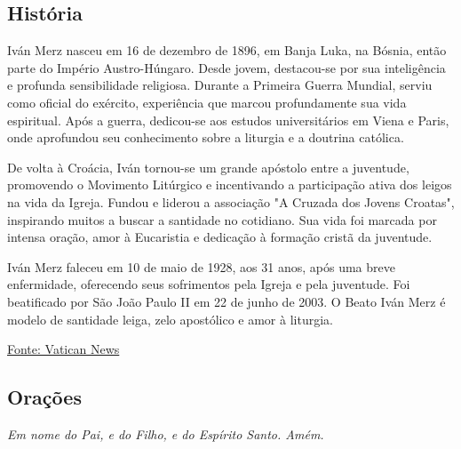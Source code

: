 \documentclass[18pt]{article}
\begin{document}
\begin{justify}
\begin{center}
\section{História}\label{sec:História}
\end{center}

Iván Merz nasceu em 16 de dezembro de 1896, em Banja Luka, na Bósnia, então parte do Império Austro-Húngaro. Desde jovem, destacou-se por sua inteligência e profunda sensibilidade religiosa. Durante a Primeira Guerra Mundial, serviu como oficial do exército, experiência que marcou profundamente sua vida espiritual. Após a guerra, dedicou-se aos estudos universitários em Viena e Paris, onde aprofundou seu conhecimento sobre a liturgia e a doutrina católica.

De volta à Croácia, Iván tornou-se um grande apóstolo entre a juventude, promovendo o Movimento Litúrgico e incentivando a participação ativa dos leigos na vida da Igreja. Fundou e liderou a associação "A Cruzada dos Jovens Croatas", inspirando muitos a buscar a santidade no cotidiano. Sua vida foi marcada por intensa oração, amor à Eucaristia e dedicação à formação cristã da juventude.

Iván Merz faleceu em 10 de maio de 1928, aos 31 anos, após uma breve enfermidade, oferecendo seus sofrimentos pela Igreja e pela juventude. Foi beatificado por São João Paulo II em 22 de junho de 2003. O Beato Iván Merz é modelo de santidade leiga, zelo apostólico e amor à liturgia.

\vfill

\begin{center}
\href{https://www.vatican.va/news_services/liturgy/saints/ns_lit_doc_20030622_merz_po.html}{Fonte: Vatican News}
\end{center}
\end{justify}


\newpage

\begin{center}
\section{Orações}\label{sec:Orações}
\textit{Em nome do Pai, e do Filho, e do Espírito Santo. Amém.}
\end{center}
\end{document}
